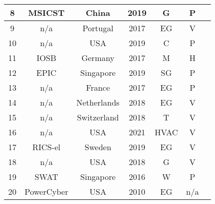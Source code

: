 \begin{longtable}[c]{|c|c|c|c|c|c|p{}|}
	8            & MSICST        & China            & 2019          & G              & P             & \cite{13-experiences-in-ICS-testbeds}              \\ \hline
	9            & n/a           & Portugal         & 2017          & EG             & V             & \cite{15-testbed-SCADA-atack}                      \\ \hline
	10           & n/a           & USA              & 2019          & C              & P             & \cite{17-SCADA-testbed}                            \\ \hline
	11           & IOSB          & Germany          & 2017          & M              & H             & \cite{22-ICS-testbed-design-and-architect}         \\ \hline
	12           & EPIC          & Singapore        & 2019          & SG             & P             & \cite{25-testbed-EPIC}                             \\ \hline
	13           & n/a           & France           & 2017          & EG             & P             & \cite{26-springer-testbeds}                        \\ \hline
	14           & n/a           & Netherlands      & 2018          & EG             & V             & \cite{27-integrated-testbed-for-SCADA-monitoring}  \\ \hline
	15           & n/a           & Switzerland      & 2018          & T              & V             & \cite{28-testbed-road-infra}                       \\ \hline
	16           & n/a           & USA              & 2021          & HVAC           & V             & \cite{31-springer-plc-and-iot-in-virtual-testbed}  \\ \hline
	17           & RICS-el       & Sweden          & 2019          & EG             & V             & \cite{32-springer-scada-testbed-research-training} \\ \hline
	18           & n/a           & USA              & 2018          & G              & V             & \cite{33-SCADA-virtual-testbed}                    \\ \hline
	19           & SWAT          & Singapore        & 2016          & W              & P             & \cite{34-ieee-swat-ics-testbed}                    \\ \hline
	20           & PowerCyber    & USA              & 2010          & EG             & n/a           & \cite{36-SCADA-testbeds-2010}                      \\ \hline

\end{longtable}
